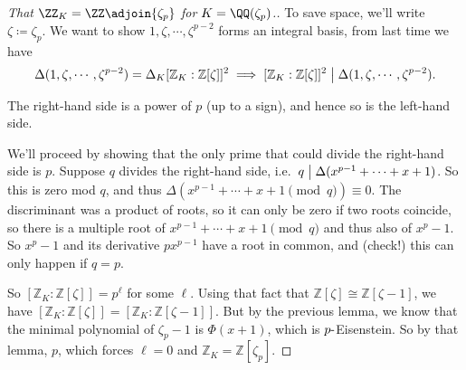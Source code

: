 \begin{proof}[That $\ZZ_K = \ZZ\adjoin{\zeta_p}$ for $K = \QQ(\zeta_p)$.]

To save space, we'll write \(\zeta \coloneqq\zeta_p\). We want to show
\(1, \zeta, \cdots, \zeta^{p-2}\) forms an integral basis, from last
time we have
\begin{align*}
{\Delta}( 1, \zeta, \cdots, \zeta^{p-2}) = 
{\Delta}_K 
[{\mathbb{Z}}_K : {\mathbb{Z}}[ \zeta ] ]^2 
\implies
[{\mathbb{Z}}_K : {\mathbb{Z}}[ \zeta ] ]^2 
\bigm|
{\Delta}( 1, \zeta, \cdots, \zeta^{p-2}) 
.\end{align*}

\begin{claim}

The right-hand side is a power of \(p\) (up to a sign), and hence so is
the left-hand side.

\end{claim}

We'll proceed by showing that the only prime that could divide the
right-hand side is \(p\). Suppose \(q\) divides the right-hand side,
i.e.~\(q \bigm|{\Delta}(x^{p-1} + \cdots + x + 1)\). So this is zero mod
\(q\), and thus
\({\Delta}( x^{p-1} + \cdots + x + 1 \pmod q) \equiv 0\). The
discriminant was a product of roots, so it can only be zero if two roots
coincide, so there is a multiple root of
\(x^{p-1} + \cdots + x + 1 \pmod q\) and thus also of \(x^p - 1\). So
\(x^p-1\) and its derivative \(px^{p-1}\) have a root in common, and
(check!) this can only happen if \(q=p\).

\hfill\break

So \([{\mathbb{Z}}_K : {\mathbb{Z}}[\zeta] ] = p^\ell\) for some
\(\ell\). Using that fact that
\({\mathbb{Z}}[ \zeta] \cong {\mathbb{Z}}[ \zeta - 1]\), we have
\([ {\mathbb{Z}}_K : {\mathbb{Z}}[ \zeta] ] = [ {\mathbb{Z}}_K: {\mathbb{Z}}[\zeta - 1] ]\).
But by the previous lemma, we know that the minimal polynomial of
\(\zeta_p - 1\) is \(\Phi(x+1)\), which is \(p{\hbox{-}}\)Eisenstein. So
by that lemma,
\(p%
\), which forces \(\ell = 0\) and
\({\mathbb{Z}}_K = {\mathbb{Z}}[ \zeta_p ]\).

\end{proof}

